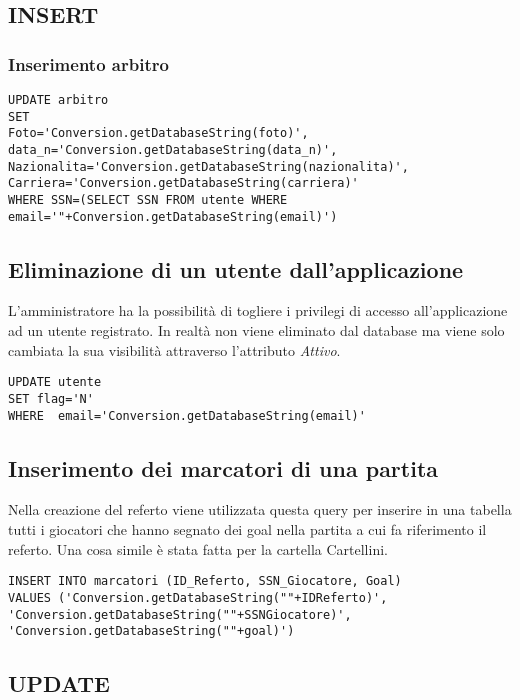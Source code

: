 \subsection{INSERT}

\subsubsection*{Inserimento arbitro}

\begin{lstlisting}
UPDATE arbitro
SET 
Foto='Conversion.getDatabaseString(foto)', data_n='Conversion.getDatabaseString(data_n)',
Nazionalita='Conversion.getDatabaseString(nazionalita)', Carriera='Conversion.getDatabaseString(carriera)'
WHERE SSN=(SELECT SSN FROM utente WHERE email='"+Conversion.getDatabaseString(email)')
\end{lstlisting}

\subsection*{Eliminazione di un utente dall'applicazione}
L'amministratore ha la possibilità di togliere i privilegi di accesso all'applicazione ad un utente registrato. In realtà non viene eliminato dal database ma viene solo cambiata la sua visibilità attraverso l'attributo \emph{Attivo}.

\begin{lstlisting}
UPDATE utente
SET flag='N' 
WHERE  email='Conversion.getDatabaseString(email)'
\end{lstlisting}


\subsection*{Inserimento dei marcatori di una partita}
Nella creazione del referto viene utilizzata questa query per inserire in una tabella tutti i giocatori che hanno segnato dei goal nella partita a cui fa riferimento il referto. Una cosa simile è stata fatta per la cartella Cartellini.

\begin{lstlisting}
INSERT INTO marcatori (ID_Referto, SSN_Giocatore, Goal) 
VALUES ('Conversion.getDatabaseString(""+IDReferto)', 'Conversion.getDatabaseString(""+SSNGiocatore)', 'Conversion.getDatabaseString(""+goal)')
\end{lstlisting}

\subsection{UPDATE}

